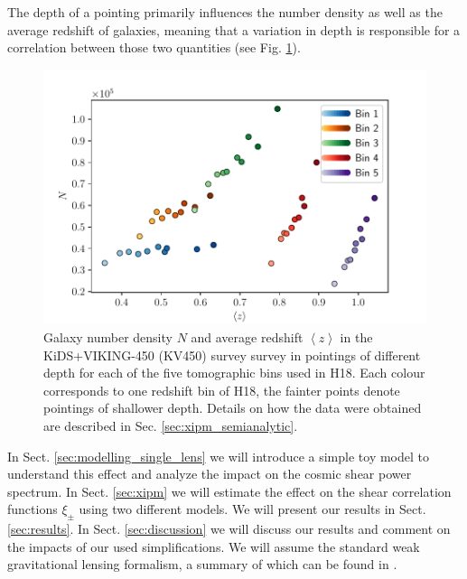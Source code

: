 \documentclass[referee]{aa} %
\renewcommand{\[}{\begin{equation}}
\renewcommand{\]}{\end{equation}}
\def\la{\left<}
\def\ra{\right>}
\begin{document}
The depth of a pointing primarily influences the number density as well as the average redshift of galaxies, meaning that a variation in depth is responsible for a correlation between those two quantities (see Fig. \ref{fig:nz_of_meanz}). 
%
\begin{figure}
\centering
\includegraphics[width=0.7\linewidth]{images/cov_nz_meanz.pdf}
\caption{Galaxy number density $N$ and average redshift $\la z\ra$ in the KiDS+VIKING-450 (KV450) survey \citep{Wright:2018} survey in pointings of different depth for each of the five tomographic bins used in H18. Each colour corresponds to one redshift bin of H18, the fainter points denote pointings of shallower depth. Details on how the data were obtained are described in Sec. \ref{sec:xipm_semianalytic}.}
\label{fig:nz_of_meanz}
\end{figure}
%
In Sect. \ref{sec:modelling_single_lens} we will introduce a simple toy model to understand this effect and analyze the impact on the cosmic shear power spectrum. In Sect. \ref{sec:xipm} we will estimate the effect on the shear correlation functions $\xi_\pm$ using two different models. We will present our results in Sect. \ref{sec:results}. In Sect. \ref{sec:discussion} we will discuss our results and comment on the impacts of our used simplifications. We will assume the standard weak gravitational lensing formalism, a summary of which can be found in \citet{2001PhR...340..291B}.
\end{document}

